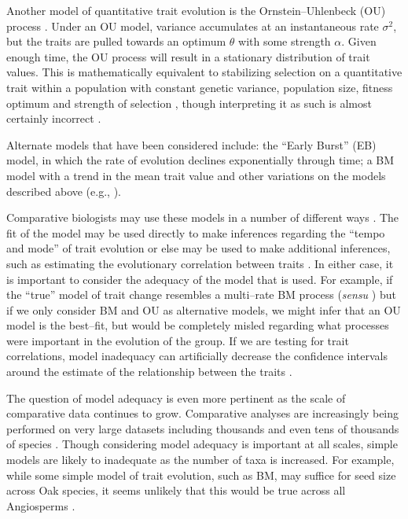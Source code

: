 \documentclass[a4paper,12pt]{article}
\begin{document}
Another model of quantitative trait evolution is the Ornstein--Uhlenbeck (OU) process \citep{Felsenstein1988, Hansen1997}. Under an OU model, variance accumulates at an instantaneous rate $\sigma^2$, but the traits are pulled towards an optimum $\theta$ with some strength $\alpha$. Given enough time, the OU process will result in a stationary distribution of trait values. This is mathematically equivalent to stabilizing selection on a quantitative trait within a population with constant genetic variance, population size, fitness optimum and strength of selection \citep{Lande1976}, though interpreting it as such is almost certainly incorrect \citep{HansenMartins1996, Hansen2012book, PennellHarmon}. 
 
Alternate models that have been considered include: the ``Early Burst'' (EB) \citep{Blomberg2003, Harmon2010} model, in which the rate of evolution declines exponentially through time; a BM model with a trend in the mean trait value \citep{Hunt2006} and other variations on the models described above (e.g., \citep{Pagel1997, Pagel1999, ButlerKing2004, Omeara2006, Eastman2011, Beaulieu2012, SlaterMEE}). 

Comparative biologists may use these models in a number of different ways \citep{Freckleton2011, PennellHarmon}. The fit of the model may be used directly to make inferences regarding the ``tempo and mode'' of trait evolution \citep{HansenMartins1996, Mooers1999, Harmon2010} or else may be used to make additional inferences, such as estimating the evolutionary correlation between traits \citep{Felsenstein1985, Grafen1989}. In either case, it is important to consider the adequacy of the model that is used. For example, if the ``true'' model of trait change resembles a multi--rate BM process (\textit{sensu} \citep{Omeara2006, Eastman2011}) but if we only consider BM and OU as alternative models, we might infer that an OU model is the best--fit, but would be completely misled regarding what processes were important in the evolution of the group. If we are testing for trait correlations, model inadequacy can artificially decrease the confidence intervals around the estimate of the relationship between the traits \citep{Rohlf2006}. 

The question of model adequacy is even more pertinent as the scale of comparative data continues to grow. Comparative analyses are increasingly being performed on very large datasets including thousands and even tens of thousands of species \citep{Coopermammal, Venditti2011, Jetz2012, Rabosky2013}. Though considering model adequacy is important at all scales, simple models are likely to inadequate as the number of taxa is increased. For example, while some simple  model of trait evolution, such as BM, may suffice for seed size across Oak species, it seems unlikely that this would be true across all Angiosperms \citep{Moles2005}.
\end{document}
